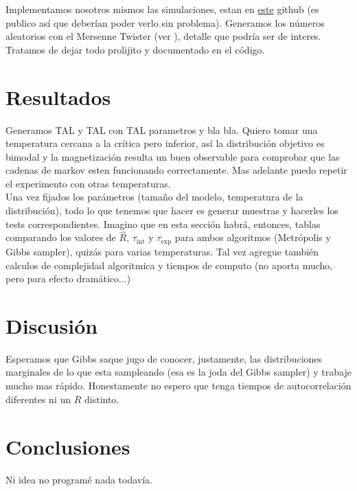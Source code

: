 \documentclass[a4paper, 12pt]{article}
\newcommand{\tauint}{\tau_\text{int}}
\newcommand{\tauexp}{\tau_\text{exp}}
\begin{document}
Implementamos nosotros mismos las simulaciones, estan en \href{https://github.com/santigiordani/fiscomp-final.git}{este} github (es publico así que deberían poder verlo sin problema). Generamos los números aleatorios con el Mersenne Twister (ver \cite{matsumoto1998mersenne}), detalle que podría ser de interes. Tratamos de dejar todo prolijito y documentado en el código.

\section{Resultados}

Generamos TAL y TAL con TAL parametros y bla bla. Quiero tomar una temperatura cercana a la crítica pero inferior, así la distribución objetivo es bimodal y la magnetización resulta un buen observable para comprobar que las cadenas de markov esten funcionando correctamente. Mas adelante puedo repetir el experimento con otras temperaturas.\\

Una vez fijados los parámetros (tamaño del modelo, temperatura de la distribución), todo lo que tenemos que hacer es generar muestras y hacerles los tests correspondientes. Imagino que en esta sección habrá, entonces, tablas comparando los valores de $\hat{R}$, $\tauint$ y $\tauexp$ para ambos algoritmos (Metrópolis y Gibbs sampler), quizás para varias temperaturas. Tal vez agregue también calculos de complejidad algoritmica y tiempos de computo (no aporta mucho, pero para efecto dramático...)

\section{Discusión}

Esperamos que Gibbs saque jugo de conocer, justamente, las distribuciones marginales de lo que esta sampleando (esa es la joda del Gibbs sampler) y trabaje mucho mas rápido. Honestamente no espero que tenga tiempos de autocorrelación diferentes ni un $\hat{R}$ distinto.

\section{Conclusiones}

Ni idea no programé nada todavía.

\printbibliography
\end{document}
